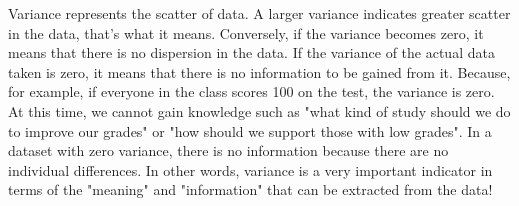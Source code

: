 \documentclass{ltjbook}
\begin{document}
Variance represents the scatter of data. A larger variance indicates greater scatter in the data, that's what it means.
Conversely, if the variance becomes zero, it means that there is no dispersion in the data.
If the variance of the actual data taken is zero, it means that there is no information to be gained from it.
Because, for example, if everyone in the class scores 100 on the test, the variance is zero. At this time, we cannot gain knowledge such as "what kind of study should we do to improve our grades" or "how should we support those with low grades". In a dataset with zero variance, there is no information because there are no individual differences. In other words, variance is a very important indicator in terms of the "meaning" and "information" that can be extracted from the data!
\end{document}
